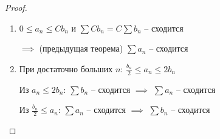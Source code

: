 \begin{theorem}
\begin{consequence}
        \begin{proof} \thmslashn 
            
            \begin{enumerate}
                \item $0 \le a_n \le Cb_n$ и $\sum Cb_n = C\sum b_n$ -- сходится 
                
                $\implies$ (предыдущая теорема) $\sum a_n$ -- сходится
    
                \item При достаточно больших $n$: $\frac{b_n}{2} \le a_n \le 2b_n$
                
                Из $ a_n \le 2b_n$: \;$\sum b_n$ -- сходится $\implies$ $\sum a_n$ -- сходится
    
                Из $\frac{b_n}{2} \le a_n$: \;$\sum a_n$ -- сходится $\implies$ $\sum b_n$ -- сходится
            \end{enumerate}
        \end{proof}
    \end{consequence}
\end{theorem}